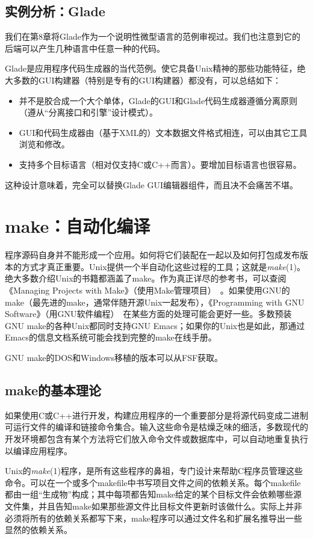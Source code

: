 \documentclass[12pt,oneside]{ctexbook}
\begin{document}
\begin{common-format}
\subsection{实例分析：Glade}
我们在第8章将Glade作为一个说明性微型语言的范例审视过。我们也注意到它的后端可以产生几种语言中任意一种的代码。

Glade是应用程序代码生成器的当代范例。使它具备Unix精神的那些功能特征，绝大多数的GUI构建器（特别是专有的GUI构建器）都没有，可以总结如下：
\begin{itemize}
\item 并不是胶合成一个大个单体，Glade的GUI和Glade代码生成器遵循分离原则（遵从“分离接口和引擎”设计模式）。
\item GUI和代码生成器由（基于XML的）文本数据文件格式相连，可以由其它工具浏览和修改。
\item 支持多个目标语言（相对仅支持C或C++而言）。要增加目标语言也很容易。
\end{itemize}

这种设计意味着，完全可以替换Glade GUI编辑器组件，而且决不会痛苦不堪。

\section{make：自动化编译}
程序源码自身并不能形成一个应用。如何将它们装配在一起以及如何打包成发布版本的方式才真正重要。Unix提供一个半自动化这些过程的工具；这就是\textit{make}(1)。绝大多数介绍Unix的书籍都涵盖了make。作为真正详尽的参考书，可以查阅《Managing Projects with Make》（使用Make管理项目）~\cite{Oram-Talbot}。如果使用GNU的make（最先进的make，通常伴随开源Unix一起发布），《Programming with GNU Software》（用GNU软件编程）~\cite{Loukides-Oram}在某些方面的处理可能会更好一些。多数预装GNU make的各种Unix都同时支持GNU Emacs；如果你的Unix也是如此，那通过Emacs的信息文档系统可能会找到完整的make在线手册。

GNU make的DOS和Windows移植的版本可以从FSF获取。

\subsection{make的基本理论}
如果使用C或C++进行开发，构建应用程序的一个重要部分是将源代码变成二进制可运行文件的编译和链接命令集合。输入这些命令是枯燥乏味的细活，多数现代的开发环境都包含有某个方法将它们放入命令文件或数据库中，可以自动地重复执行以编译应用程序。

Unix的\textit{make}(1)程序，是所有这些程序的鼻祖，专门设计来帮助C程序员管理这些命令。可以在一个或多个makefile中书写项目文件之间的依赖关系。每个makefile都由一组“生成物”构成；其中每项都告知make给定的某个目标文件会依赖哪些源文件集，并且告知make如果那些源文件比目标文件更新时该做什么。实际上并非必须将所有的依赖关系都写下来，make程序可以通过文件名和扩展名推导出一些显然的依赖关系。


\end{common-format}
\end{document}
